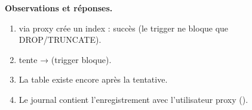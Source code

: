 
\textbf{Observations et réponses.}
\begin{enumerate}
  \item {} via proxy crée un index : succès (le trigger ne bloque que DROP/TRUNCATE).
  \item {} tente  →  (trigger bloque).
  \item La table  existe encore après la tentative.
  \item Le journal  contient l'enregistrement  avec l'utilisateur proxy ().
\end{enumerate}
